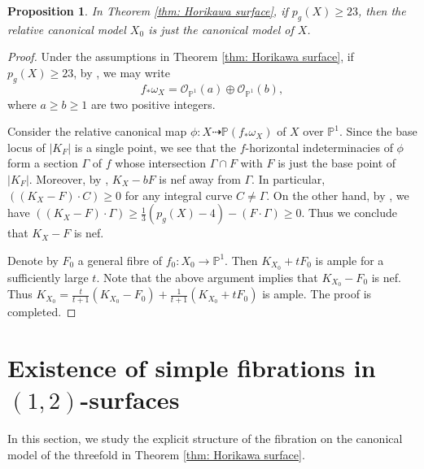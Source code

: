 \documentclass[a4paper,11pt]{amsart}
\newcommand{\PP}{\ensuremath{\mathbb{P}}}
\newtheorem{prop}[thm]{Proposition}
\theoremstyle{definition}
\theoremstyle{remark}
\numberwithin{equation}{section}
\begin{document}
\begin{prop} \label{prop: pg23}
	In Theorem \ref{thm: Horikawa surface}, if $p_g(X) \ge 23$, then the relative canonical model $X_0$ is just the canonical model of $X$.
\end{prop}

\begin{proof}
	Under the assumptions in Theorem \ref{thm: Horikawa surface}, if $p_g(X) \ge 23$, by \cite[Proposition 3.13 and Lemma 3.3]{HZ}, we may write 
	$$
	f_*\omega_{X} = \mathcal{O}_{\PP^1}(a) \oplus \mathcal{O}_{\PP^1}(b),
	$$
	where $a \ge b \ge 1$ are two positive integers.
	
	Consider the relative canonical map $\phi: X \dasharrow \PP(f_*\omega_{X})$ of $X$ over $\PP^1$. Since the base locus of $|K_F|$ is a single point, we see that the $f$-horizontal indeterminacies of $\phi$ form a section $\Gamma$ of $f$ whose intersection $\Gamma \cap F$ with $F$ is just the base point of $|K_F|$. Moreover, by \cite[Corollary 3.5]{Miyaoka}, $K_X - bF$ is nef away from $\Gamma$. In particular, $\left((K_X - F) \cdot C\right) \ge 0$ for any integral curve $C \ne \Gamma$. On the other hand, by \cite[Proposition 3.5]{HZ}, we have $\left((K_X - F) \cdot \Gamma\right) \ge \frac{1}{3}(p_g(X) - 4) - (F \cdot \Gamma) \ge 0$. Thus we conclude that $K_X - F$ is nef. 
	
	Denote by $F_0$ a general fibre of $f_0: X_0 \to \PP^1$. Then $K_{X_0} + tF_0$ is ample for a sufficiently large $t$. Note that the above argument implies that $K_{X_0} - F_0$ is nef. Thus $K_{X_0} = \frac{t}{t+1}(K_{X_0} - F_0) + \frac{1}{t+1}(K_{X_0} + tF_0)$ is ample. The proof is completed.
\end{proof}


\section{Existence of simple fibrations in \texorpdfstring{$(1, 2)$}{(1, 2)}-surfaces} \label{section: simple fibration}

In this section, we study the explicit structure of the fibration on the canonical model of the threefold in Theorem \ref{thm: Horikawa surface}.
\end{document}
